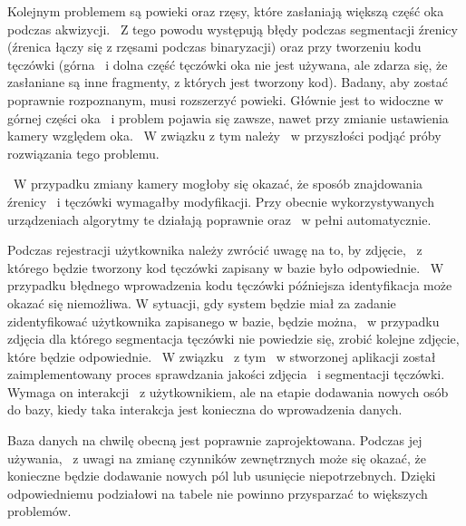 Kolejnym problemem są powieki oraz rzęsy, które zasłaniają większą część oka podczas akwizycji. ~Z tego powodu występują błędy podczas segmentacji źrenicy (źrenica łączy się z rzęsami podczas binaryzacji) oraz przy tworzeniu kodu tęczówki (górna ~i dolna część tęczówki oka nie jest używana, ale zdarza się, że zasłaniane są inne fragmenty, z których jest tworzony kod). Badany, aby zostać poprawnie rozpoznanym, musi rozszerzyć powieki. Głównie jest to widoczne w górnej części oka ~i problem pojawia się zawsze, nawet przy zmianie ustawienia kamery względem oka. ~W związku z tym należy ~w przyszłości podjąć próby rozwiązania tego problemu.

~W przypadku zmiany kamery mogłoby się okazać, że sposób znajdowania źrenicy ~i tęczówki wymagałby modyfikacji. Przy obecnie wykorzystywanych urządzeniach algorytmy te działają poprawnie oraz ~w pełni automatycznie.

Podczas rejestracji użytkownika należy zwrócić uwagę na to, by zdjęcie, ~z którego będzie tworzony kod tęczówki zapisany w bazie było odpowiednie. ~W przypadku błędnego wprowadzenia kodu tęczówki późniejsza identyfikacja może okazać się niemożliwa. W sytuacji, gdy system będzie miał za zadanie zidentyfikować użytkownika zapisanego w bazie, będzie można, ~w przypadku zdjęcia dla którego segmentacja tęczówki nie powiedzie się, zrobić kolejne zdjęcie, które będzie odpowiednie. ~W związku ~z tym ~w stworzonej aplikacji został zaimplementowany proces sprawdzania jakości zdjęcia ~i segmentacji tęczówki. Wymaga on interakcji ~z użytkownikiem, ale na etapie dodawania nowych osób do bazy, kiedy taka interakcja jest konieczna do wprowadzenia danych.

Baza danych na chwilę obecną jest poprawnie zaprojektowana. Podczas jej używania, ~z uwagi na zmianę czynników zewnętrznych może się okazać, że konieczne będzie dodawanie nowych pól lub usunięcie niepotrzebnych. Dzięki odpowiedniemu podziałowi na tabele nie powinno przysparzać to większych problemów.


